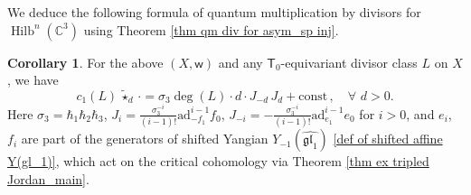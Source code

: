 \documentclass[10pt]{amsart}
\theoremstyle{definition}
\newtheorem{Corollary}[Theorem]{Corollary}
\numberwithin{equation}{section}
\newcommand{\C}{\mathbb{C}}
\newcommand{\sT}{\mathsf{T}}
\newcommand{\sw}{\mathsf{w}}
\newcommand{\Hilb}{\operatorname{Hilb}}
\newcommand{\yl}[1]{\textcolor{blue}{$[$ Yalong: #1 $]$}}
\begin{document}

We deduce the following formula of quantum multiplication by divisors for $\Hilb^n(\C^3)$ using Theorem \ref{thm qm div for asym_sp inj}. 

\begin{Corollary}\label{cor on qmd hilb3}
For the above $(X,\sw)$ and any $\sT_0$-equivariant divisor class $L$ on $X$, we have 
\begin{equation}\label{equ on MdL of hilb}
c_1(L)\, \widetilde{\star}_{d}\, \cdot =\sigma_3\deg(L)\cdot d\cdot J_{-d}\, J_{d}+\mathrm{const}\,, \quad \forall\,\,d>0.
\end{equation}
Here $\sigma_3=\hbar_1\hbar_2\hbar_3$, $J_i=\frac{\sigma_3^{-i}}{(i-1)!} \text{ad}^{i-1} _{-f_1} f_0$, $J_{-i}=-\frac{\sigma_3^{-i}}{(i-1)!} \text{ad}^{i-1} _{e_1} e_0$ for $i>0$,
and $e_i$, $f_i$ are part of the generators of shifted Yangian $Y_{-1}(\widehat{\mathfrak{gl}_1})$ \eqref{def of shifted affine Y(gl_1)}, which act on the critical cohomology via Theorem \ref{thm ex tripled Jordan_main}. 
\end{Corollary}
\end{document}
